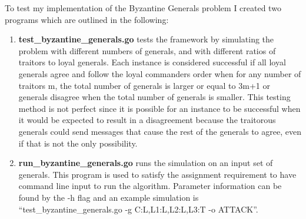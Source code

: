 \documentclass[11pt]{article}
\begin{document}
To test my implementation of the Byzantine Generals problem I created two programs which are outlined in the following:
\begin{enumerate}
\item
\textbf{test\_byzantine\_generals.go} tests the framework by simulating the problem with different numbers of generals, and with different ratios of traitors to loyal generals. Each instance is considered successful if all loyal generals agree and follow the loyal commanders order when for any number of traitors m, the total number of generals is larger or equal to 3m+1 or generals disagree when the total number of generals is smaller. This testing method is not perfect since it is possible for an instance to be successful when it would be expected to result in a disagreement because the traitorous generals could send messages that cause the rest of the generals to agree, even if that is not the only possibility.

\item
\textbf{run\_byzantine\_generals.go} runs the simulation on an input set of generals. This program is used to satisfy the assignment requirement to have command line input to run the algorithm. Parameter information can be found by the -h flag and an example simulation is “test\_byzantine\_generals.go -g C:L,L1:L,L2:L,L3:T -o ATTACK”.
\end{enumerate}
\end{document}
